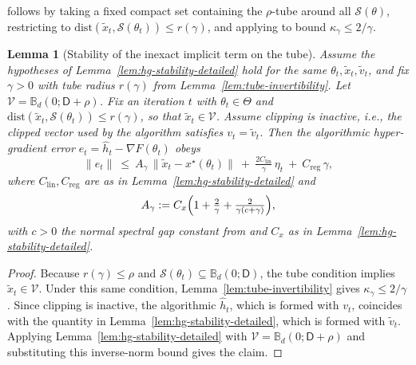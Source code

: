 \documentclass{article}
\theoremstyle{normaltheorem}
\newtheorem{lemma}[lemma]{Lemma}
\newcommand{\calS}{\mathcal{S}}
\begin{document}
\noindent {} follows by taking a fixed compact set containing the \(\rho\)-tube around all \(\calS(\theta)\), restricting to
$\mathrm{dist}(\tilde x_t,\calS(\theta_t))\le r(\gamma)$, and applying  to bound $\kappa_\gamma\le 2/\gamma$.
\begin{lemma}[Stability of the inexact implicit term on the tube]\label{lem:hg-stability}
Assume the hypotheses of Lemma~\ref{lem:hg-stability-detailed} hold for the same \(\theta_t,\tilde x_t,\tilde v_t\), and fix $\gamma>0$ with tube radius $r(\gamma)$ from Lemma~\ref{lem:tube-invertibility}.
Let $\mathcal V=\mathbb B_d(0;\mathsf D+\rho)$.
Fix an iteration $t$ with $\theta_t\in\Theta$ and $\mathrm{dist}(\tilde x_t,\calS(\theta_t))\le r(\gamma)$, so that $\tilde x_t\in\mathcal V$.
Assume clipping is inactive, i.e., the clipped vector used by the algorithm satisfies $v_t=\tilde v_t$.
Then the algorithmic hyper-gradient error $e_t=\widehat h_t-\nabla F(\theta_t)$ obeys
\[
\|e_t\|
\ \le\
A_\gamma\,\|\tilde x_t-x^\star(\theta_t)\|
\ +\ \tfrac{2C_{\mathrm{lin}}}{\gamma}\,\eta_t
\ +\ C_{\mathrm{reg}}\,\gamma,
\]
where $C_{\mathrm{lin}},C_{\mathrm{reg}}$ are as in Lemma~\ref{lem:hg-stability-detailed} and
\[
A_\gamma
:=
C_x\Bigl(1+\tfrac{2}{\gamma}+\tfrac{2}{\gamma(c+\gamma)}\Bigr),
\]
with $c>0$ the normal spectral gap constant from  and $C_x$ as in Lemma~\ref{lem:hg-stability-detailed}.
\end{lemma}
\begin{proof}
Because \(r(\gamma)\le\rho\) and \(\calS(\theta_t)\subseteq\mathbb B_d(0;\mathsf D)\), the tube condition implies \(\tilde x_t\in\mathcal V\).
Under this same condition, Lemma~\ref{lem:tube-invertibility} gives $\kappa_\gamma\le 2/\gamma$.
Since clipping is inactive, the algorithmic \(\widehat h_t\), which is formed with \(v_t\), coincides with the quantity in Lemma~\ref{lem:hg-stability-detailed}, which is formed with \(\tilde v_t\).
Applying Lemma~\ref{lem:hg-stability-detailed} with $\mathcal V=\mathbb B_d(0;\mathsf D+\rho)$ and substituting this inverse-norm bound gives the claim.
\end{proof}
\end{document}
